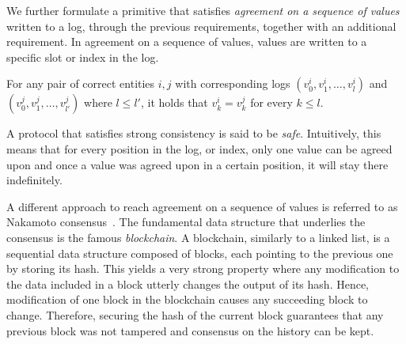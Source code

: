 We further formulate a primitive that satisfies \emph{agreement on a sequence of values} written to a log, through the previous requirements, together with an additional requirement. In agreement on a sequence of values, values are written to a specific slot or index in the log.
\begin{definition}
For any pair of correct entities $i,j$ with corresponding logs $(v_0^i,v_1^i,\dots,v_l^i)$ and $(v_0^j,v_1^j,\dots,v_{l'}^j)$ where $l \leq l'$, it holds that $v_k^i=v_k^j$ for every $k \leq l$.
\end{definition}

A protocol that satisfies strong consistency is said to be \emph{safe}. Intuitively, this means that for every position in the log, or index, only one value can be agreed upon and once a value was agreed upon in a certain position, it will stay there indefinitely.


A different approach to reach agreement on a sequence of values is referred to as Nakamoto consensus~\cite{Bitcoin}. The fundamental data structure that underlies the consensus is the famous \emph{blockchain}.
A blockchain, similarly to a linked list, is a sequential data structure composed of blocks, each pointing to the previous one by storing its hash. This yields a very strong property where any modification to the data included in a block utterly changes the output of its hash. Hence, modification of one block in the blockchain causes any succeeding block to change. Therefore, securing the hash of the current block guarantees that any previous block was not tampered and consensus on the history can be kept.

